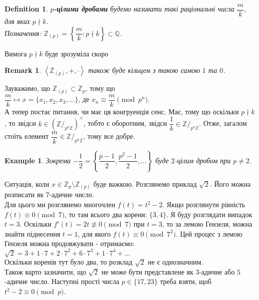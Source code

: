 \documentclass[a4paper, 14pt]{extarticle}
\theoremstyle{theoremdd}
\theoremstyle{theoremdd}
\newtheorem{definition}[theorem]{Definition}
\theoremstyle{theoremdd}
\theoremstyle{theoremdd}
\newtheorem{example}[theorem]{Example}
\theoremstyle{theoremdd}
\theoremstyle{theoremdd}
\newtheorem{remark}[theorem]{Remark}
\theoremstyle{theoremdd}
\theoremstyle{theoremdd}
\begin{document}
\begin{definition}
\textbf{$p$-цілими дробами} будемо називати такі раціональні числа $\dfrac{m}{k}$, для яких $p \nmid k$.\\
Позначення: $\mathbb{Z}_{(p)} = \left\{ \dfrac{m}{k} : p \nmid k \right\} \subset \mathbb{Q}$.
\end{definition}

Вимога $p \nmid k$ буде зрозуміла скоро

\begin{remark}
$\left<\mathbb{Z}_{(p)},+,\cdot \right>$ також буде кільцем з такою самою $1$ та $0$.
\end{remark}

Зауважимо, що $\mathbb{Z}_{(p)} \subset \mathbb{Z}_p$, тому що\\
$\dfrac{m}{k} \mapsto x = \{x_1,x_2,x_3,\dots\}$, де $x_n \equiv \dfrac{m}{k} \pmod {p^n}$.\\
А тепер постає питання, чи має ця конгруенція сенс. Має, тому що оскільки $p \nmid k$, то звідси $k \in \left(\mathbb{Z}/_{p^n \mathbb{Z}}\right)^\times$, тобто є оборотним, звідси $\dfrac{1}{k} \in \mathbb{Z}/_{p^n \mathbb{Z}}$. Отже, загалом стоїть елемент $\dfrac{m}{k} \in \mathbb{Z}/_{p^n \mathbb{Z}}$, тому все добре.

\begin{example}
Зокрема $-\dfrac{1}{2} = \left\{ \dfrac{p-1}{2}, \dfrac{p^2-1}{2}, \dots \right\}$ буде $2$-цілим дробом при $p \neq 2$.
\end{example}

Ситуація, коли $x \in \mathbb{Z}_p \setminus \mathbb{Z}_{(p)}$ буде важкою. Розглянемо приклад $\sqrt{2}$. Його можна розписати як $7$-адичне число.\\
Для цього ми розглянемо многочлен $f(t) = t^2 - 2$. Якщо розглянути рівність $f(t) \equiv 0 \pmod 7$, то там всього два корени: $\{3,4\}$. Я буду розглядати випадок $t = 3$. Оскільки $f'(t) = 2t \not\equiv 0 \pmod 7$ при $t = 3$, то за лемою Гензеля, можна знайти піднесення $t = 1$, для якого $f(t) \equiv 0 \pmod {7^2}$. Цей процес з лемою Гензеля можна продовжувати - отримаємо:\\
$\sqrt{2} = 3 + 1 \cdot 7 + 2 \cdot 7^2 + 6 \cdot 7^3 + 1 \cdot 7^4 + \dots$\\
Оскільки коренів тут було два, то розклад $\sqrt{2}$ не є однозначним.
\bigskip \\
Також варто зазначити, що $\sqrt{2}$ не може бути представлене як $3$-адичне або $5$-адичне число. Наступні прості числа $p \in \{17,23\}$ треба взяти, щоб $t^2-2 \equiv 0 \pmod p$.
\end{document}
